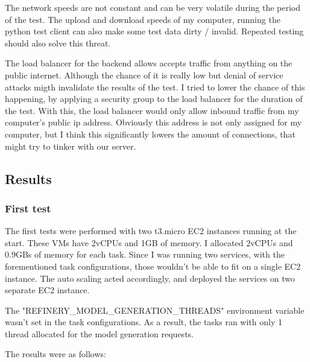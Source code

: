 			The network speeds are not constant and can be very volatile during the period of the test. The upload and download speeds of my computer, running the 
			python test client can also make some test data dirty / invalid.  Repeated testing should also solve this threat.

			The load balancer for the backend allows accepts traffic from anything on the public internet. Although the chance of it is really low
			but denial of service attacks migth invalidate the results of the test. I tried to lower the chance of this happening, by applying a security group
			to the load balancer for the duration of the test. With this, the load balancer would only allow inbound traffic from my computer's public ip address.
			Obviously this address is not only assigned for my computer, but I think this significantly lowers the amount of connections, that might try to tinker
			with our server.

		\subsection{Results}
		\subsubsection{First test} \label{firsttest}
		The first tests were performed with two t3.micro EC2 instances running at the start. These VMs have 2vCPUs and 1GB of memory. I allocated
		2vCPUs and 0.9GBs of memory for each task. Since I was running two services, with the forementioned task configurations, 
		those wouldn't be able to fit on a single EC2 instance. The auto scaling acted accordingly, and deployed the services on two 
		separate EC2 instance. 

		The "REFINERY\_MODEL\_GENERATION\_THREADS" environment variable wasn't set in the task configurations. As a result, the tasks ran with only 1 thread
		allocated for the model generation requests.

		The results were as follows:

